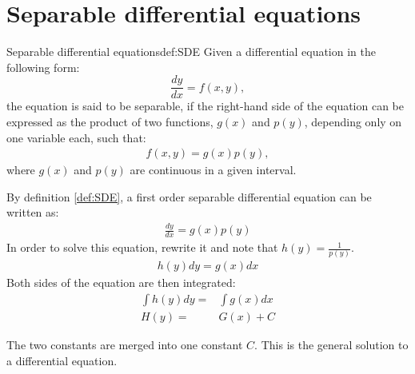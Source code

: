 \section{Separable differential equations}\label{SepDiff}
\begin{definition}{Separable differential equations}{def:SDE}
Given a differential equation in the following form: 
$$\frac{dy}{dx} = f(x,y),$$
the equation is said to be separable, if the right-hand side of the equation can be expressed as the product of two functions, $g(x)$ and $p(y)$, depending only on one variable each, such that:
\begin{align}
f(x,y)=g(x)p(y),
\end{align}
where $g(x)$ and $p(y)$ are continuous in a given interval.
\end{definition}
\noindent
By definition \ref{def:SDE}, a first order separable differential equation can be written as:
\begin{align}
	\frac{dy}{dx}=g(x)p(y)
\end{align}
In order to solve this equation, rewrite it and note that $h(y) = \frac{1}{p(y)}$.
\begin{align}
	h(y)dy=g(x)dx
\end{align}
Both sides of the equation are then integrated:
 \begin{align}
 	\int h(y)dy =&\int g(x)dx   \\
 	H(y)=&G(x)+C \label{SDEG}
 \end{align}
 
The two constants are merged into one constant $C$. This is the general solution to a differential equation. \cite{diffandcomplex}

